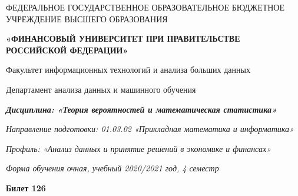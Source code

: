 \documentclass[a4paper,14pt]{article}
\begin{document}
\begin{center}
ФЕДЕРАЛЬНОЕ ГОСУДАРСТВЕННОЕ ОБРАЗОВАТЕЛЬНОЕ БЮДЖЕТНОЕ УЧРЕЖДЕНИЕ ВЫСШЕГО ОБРАЗОВАНИЯ

    \textbf{«ФИНАНСОВЫЙ УНИВЕРСИТЕТ ПРИ ПРАВИТЕЛЬСТВЕ РОССИЙСКОЙ ФЕДЕРАЦИИ»}

Факультет информационных технологий и анализа больших данных

Департамент анализа данных и машинного обучения

\textit{
	\textbf{Дисциплина: «Теория вероятностей и математическая статистика»}}

\textit{Направление подготовки: 01.03.02 «Прикладная математика и информатика»}

\textit{Профиль: «Анализ данных и принятие решений в экономике и финансах»}

\textit{Форма обучения очная, учебный 2020/2021 год, 4 семестр}

\textbf{Билет 126}

\end{center}
\end{document}
